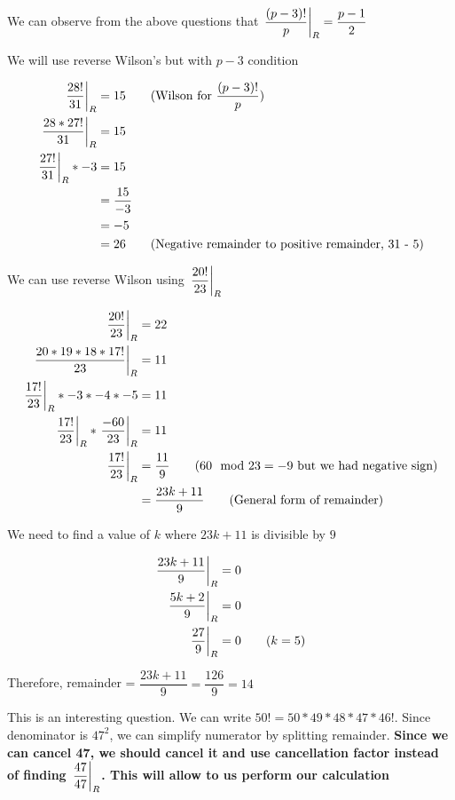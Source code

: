 \begin{EXTRA-LEARNING}
    We can observe from the above questions that $\displaystyle{ \left. \frac{(p-3)!}{p} \right |_{R} } = \dfrac{p-1}{2}$
\end{EXTRA-LEARNING}


We will use reverse Wilson's but with $p-3$ condition

\begin{align*}
    \remFrac{28!}{31} &= 15 \tag{Wilson for $\dfrac{(p-3)!}{p}$} \\
    \remFrac{28 * 27!}{31} &= 15 \\
    \remFrac{27!}{31} * -3 &= 15 \\
    &= \dfrac{15}{-3} \\
    &= -5 \\
    &= 26 \tag{Negative remainder to positive remainder, 31 - 5}
\end{align*}


We can use reverse Wilson using $\displaystyle{ \left. \frac{20!}{23} \right |_{R} }$

\begin{align*}
    \displaystyle{ \left. \frac{20!}{23} \right |_{R} } &= 22 \\
    \displaystyle{ \left. \frac{20 * 19 * 18 * 17!}{23} \right |_{R} } &= 11 \\
    \displaystyle{ \left. \frac{17!}{23} \right |_{R} } * -3 * -4 * -5 &= 11 \\
    \displaystyle{ \left. \frac{17!}{23} \right |_{R} } * \displaystyle{ \left. \frac{-60}{23} \right |_{R} } &= 11 \\
    \displaystyle{ \left. \frac{17!}{23} \right |_{R} } &= \dfrac{11}{9} \tag{$60 \mod 23 = -9$ but we had negative sign}\\
    &= \dfrac{23k + 11}{9} \tag{General form of remainder} \\
\end{align*}

We need to find a value of $k$ where $23k + 11$ is divisible by $9$

\begin{align*}
    \displaystyle{ \left. \frac{23k + 11}{9} \right |_{R} } &= 0 \\
    \displaystyle{ \left. \frac{5k + 2}{9} \right |_{R} } &= 0 \\
    \displaystyle{ \left. \frac{27}{9} \right |_{R} } &= 0 \tag{$k=5$} \\
\end{align*}

Therefore, remainder = $\dfrac{23k + 11}{9} = \dfrac{126}{9} = 14$


This is an interesting question. We can write $50! = 50 * 49 * 48 * 47 * 46!$. Since denominator is $47^2$, we can simplify numerator by splitting remainder. \textbf{Since we can cancel 47, we should cancel it and use cancellation factor instead of finding $\displaystyle{ \left. \frac{47}{47} \right |_{R} }$. This will allow to us perform our calculation}

